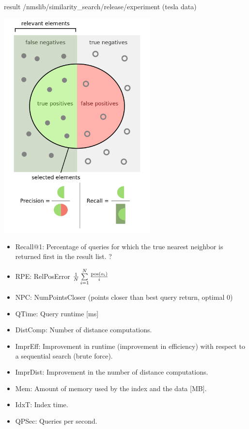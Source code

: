 \documentclass[xcolor=dvipsnames, aspectratio=1610]{beamer}
\begin{document}
\begin{frame}[fragile]{result /nmslib/similarity_search/release/experiment (tesla data)}
{\begin{minipage}{0.99\textwidth}
{}
\end{minipage}
\fboxsep=15pt 
\begin{minipage}{0.45\textwidth} 
\includegraphics[width=0.6\textwidth]{Figures/Precisionrecall.png}
\end{minipage}  
\begin{minipage}{0.45\textwidth} 
\begin{itemize}
\item Recall@1: Percentage of queries for which the true nearest neighbor is returned first in the result list. ?
\item RPE: RelPosError $\frac{1}{N} \sum\limits^N_{i=1} \frac{{\rm pos} \left( o_i \right)}{i}  $ 
\item NPC: NumPointsCloser (points closer than best query return, optimal 0)
\item QTime: Query runtime [ms] 
\item DistComp: Number of distance computations.
\item ImprEff:  Improvement in runtime (improvement in efficiency) with respect to a sequential search (brute force).
\item ImprDist:  Improvement in the number of distance computations.
\item Mem:  Amount of memory used by the index and the data [MB].
\item IdxT: Index time. 
\item QPSec: Queries per second.
\end{itemize}
\end{minipage} }
\end{frame}
\end{document}
